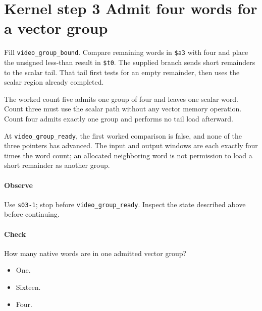 \section{Kernel step 3 Admit four words for a vector group}
Fill \texttt{video\_group\_bound}. Compare remaining words in \texttt{\$a3} with four and place the unsigned less-than result in \texttt{\$t0}. The supplied branch sends short remainders to the scalar tail. That tail first tests for an empty remainder, then uses the scalar region already completed.

The worked count five admits one group of four and leaves one scalar word. Count three must use the scalar path without any vector memory operation. Count four admits exactly one group and performs no tail load afterward.

At \texttt{video\_group\_ready}, the first worked comparison is false, and none of the three pointers has advanced. The input and output windows are each exactly four times the word count; an allocated neighboring word is not permission to load a short remainder as another group.

\paragraph{Observe} Use \texttt{s03-1}; stop before \texttt{video\_group\_ready}. Inspect the state described above before continuing.

\paragraph{Check} How many native words are in one admitted vector group?
\begin{itemize}
\item[A.] One.
\item[B.] Sixteen.
\item[C.] Four.
\end{itemize}
